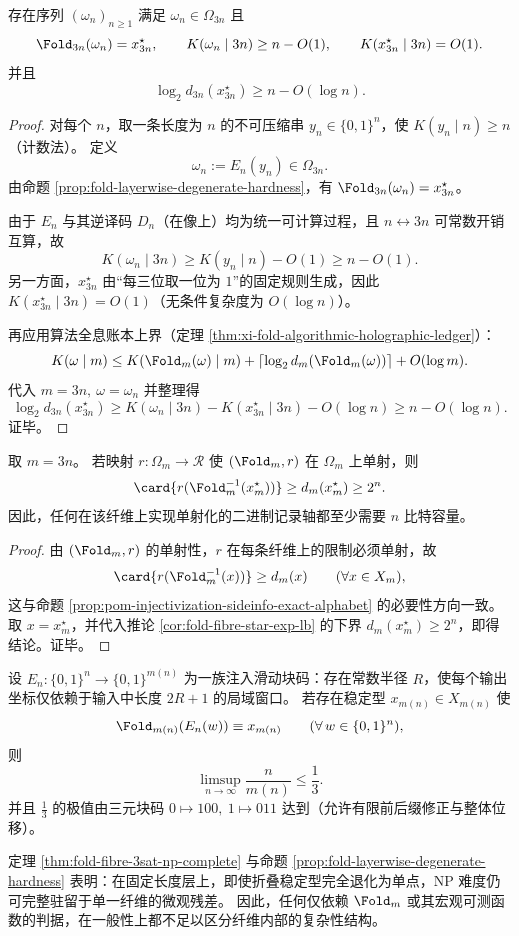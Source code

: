 \begin{theorem}[固定稳定型上的算法信息坍缩尺度]\label{thm:fold-fixed-fiber-kolmogorov-collapse}
存在序列 \((\omega_n)_{n\ge 1}\) 满足 \(\omega_n\in\Omega_{3n}\) 且
\[
\Fold_{3n}(\omega_n)=x^\star_{3n},
\qquad
K(\omega_n\mid 3n)\ge n-O(1),
\qquad
K(x^\star_{3n}\mid 3n)=O(1).
\]
并且
\[
\log_2 d_{3n}(x^\star_{3n})\ge n-O(\log n).
\]
\end{theorem}

\begin{proof}
对每个 \(n\)，取一条长度为 \(n\) 的不可压缩串 \(y_n\in\{0,1\}^n\)，使
\(
K(y_n\mid n)\ge n
\)（计数法）。
定义
\[
\omega_n:=E_n(y_n)\in\Omega_{3n}.
\]
由命题 \ref{prop:fold-layerwise-degenerate-hardness}，有
\(
\Fold_{3n}(\omega_n)=x^\star_{3n}
\)。
\par
由于 \(E_n\) 与其逆译码 \(D_n\)（在像上）均为统一可计算过程，且 \(n\leftrightarrow 3n\) 可常数开销互算，故
\[
K(\omega_n\mid 3n)\ge K(y_n\mid n)-O(1)\ge n-O(1).
\]
另一方面，\(x^\star_{3n}\) 由“每三位取一位为 \(1\)”的固定规则生成，因此
\(
K(x^\star_{3n}\mid 3n)=O(1)
\)（无条件复杂度为 \(O(\log n)\)）。
\par
再应用算法全息账本上界（定理 \ref{thm:xi-fold-algorithmic-holographic-ledger}）：
\[
K(\omega\mid m)\le K(\Fold_m(\omega)\mid m)+\lceil\log_2 d_m(\Fold_m(\omega))\rceil + O(\log m).
\]
代入 \(m=3n,\ \omega=\omega_n\) 并整理得
\[
\log_2 d_{3n}(x^\star_{3n})
\ge
K(\omega_n\mid 3n)-K(x^\star_{3n}\mid 3n)-O(\log n)
\ge
n-O(\log n).
\]
证毕。
\end{proof}

\begin{corollary}[单射化外置账本的线性位数下界]\label{cor:fold-fixed-fiber-external-ledger-linear}
取 \(m=3n\)。
若映射 \(r:\Omega_m\to\mathcal R\) 使 \((\Fold_m,r)\) 在 \(\Omega_m\) 上单射，则
\[
\card{r(\Fold_m^{-1}(x^\star_m))}
\ge
d_m(x^\star_m)
\ge
2^n.
\]
因此，任何在该纤维上实现单射化的二进制记录轴都至少需要 \(n\) 比特容量。
\end{corollary}

\begin{proof}
由 \((\Fold_m,r)\) 的单射性，\(r\) 在每条纤维上的限制必须单射，故
\[
\card{r(\Fold_m^{-1}(x))}\ge d_m(x)\qquad(\forall x\in X_m),
\]
这与命题 \ref{prop:pom-injectivization-sideinfo-exact-alphabet} 的必要性方向一致。
取 \(x=x^\star_m\)，并代入推论 \ref{cor:fold-fibre-star-exp-lb} 的下界 \(d_m(x^\star_m)\ge 2^n\)，即得结论。证毕。
\end{proof}

\begin{conjecture}[局域注入块码的单纤维信息率上界]\label{conj:fold-local-injective-code-rate-cap}
设 \(E_n:\{0,1\}^n\to\{0,1\}^{m(n)}\) 为一族注入滑动块码：存在常数半径 \(R\)，使每个输出坐标仅依赖于输入中长度 \(2R+1\) 的局域窗口。
若存在稳定型 \(x_{m(n)}\in X_{m(n)}\) 使
\[
\Fold_{m(n)}(E_n(w))\equiv x_{m(n)}
\qquad(\forall\,w\in\{0,1\}^n),
\]
则
\[
\limsup_{n\to\infty}\frac{n}{m(n)}\le \frac13.
\]
并且 \(\frac13\) 的极值由三元块码
\(
0\mapsto 100,\ 1\mapsto 011
\)
达到（允许有限前后缀修正与整体位移）。
\end{conjecture}

\begin{remark}[方法学边界]
定理 \ref{thm:fold-fibre-3sat-np-complete} 与命题 \ref{prop:fold-layerwise-degenerate-hardness} 表明：在固定长度层上，即使折叠稳定型完全退化为单点，NP 难度仍可完整驻留于单一纤维的微观残差。
因此，任何仅依赖 \(\Fold_m\) 或其宏观可测函数的判据，在一般性上都不足以区分纤维内部的复杂性结构。
\end{remark}

\endinput
